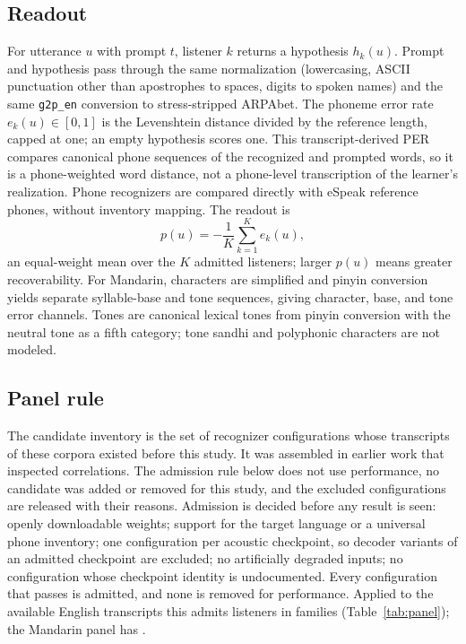 \subsection{Readout}
For utterance $u$ with prompt $t$, listener $k$ returns a hypothesis
$h_k(u)$. Prompt and hypothesis pass through the same normalization
(lowercasing, ASCII punctuation other than apostrophes to spaces, digits to
spoken names) and the same \texttt{g2p\_en} conversion to stress-stripped
ARPAbet. The phoneme error rate $e_k(u)\in[0,1]$ is the Levenshtein distance
divided by the reference length, capped at one; an empty hypothesis scores
one. This transcript-derived PER compares canonical phone sequences of the
recognized and prompted words, so it is a phone-weighted word distance,
not a phone-level transcription of the learner's realization. Phone recognizers are compared directly with eSpeak reference phones,
without inventory mapping. The readout is
\begin{equation}
p(u)=-\frac{1}{K}\sum_{k=1}^{K}e_k(u),
\label{eq:panel}
\end{equation}
an equal-weight mean over the $K$ admitted listeners; larger $p(u)$ means
greater recoverability. For Mandarin, characters are simplified and pinyin conversion
yields separate syllable-base and tone sequences, giving character, base,
and tone error channels. Tones are canonical lexical tones from pinyin
conversion with the neutral tone as a fifth category; tone sandhi and
polyphonic characters are not modeled.

\subsection{Panel rule}
The candidate inventory is the set of recognizer configurations whose
transcripts of these corpora existed before this study. It was assembled in earlier work that inspected \so{} correlations. The
admission rule below does not use performance, no candidate was added or
removed for this study, and the excluded configurations are released with
their reasons. Admission is decided before any result is seen:
openly downloadable weights; support for the target language or a universal phone inventory;
one configuration per acoustic checkpoint, so decoder variants of an
admitted checkpoint are excluded; no artificially degraded inputs; no
configuration whose checkpoint identity is undocumented. Every
configuration that passes is admitted, and none is removed for performance.
Applied to the available English transcripts this admits 
listeners in  families (Table~\ref{tab:panel}); the Mandarin
panel has .


